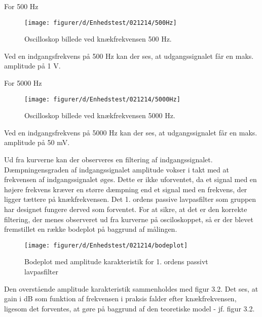 For 500 Hz

\begin{figure}[H]
    \centering
    \texttt{[image: figurer/d/Enhedstest/021214/500Hz]}
    \caption{Oscilloskop billede ved knækfrekvensen 500 Hz.}
    \label{figtest_50Hz}
\end{figure}

Ved en indgangsfrekvens på 500 Hz kan der ses, at udgangssignalet får en maks. amplitude på 1 V.

For 5000 Hz

\begin{figure}[H]
    \centering
    \texttt{[image: figurer/d/Enhedstest/021214/5000Hz]}
    \caption{Oscilloskop billede ved knækfrekvensen 5000 Hz.}
    \label{figtest_50Hz}
\end{figure}

Ved en indgangsfrekvens på 5000 Hz kan der ses, at udgangssignalet får en maks. amplitude på 50 mV.

Ud fra kurverne kan der observeres en filtering af indgangssignalet. 
Dæmpningensgraden af indgangssignalet amplitude vokser i takt med at frekvensen af indgangssignalet øges. 
Dette er ikke uforventet, da et signal med en højere frekvens kræver en større dæmpning end et signal med en frekvens, der ligger tættere på knækfrekvensen. 
Det 1. ordens passive lavpasfilter som gruppen har designet fungere derved som forventet. 
For at sikre, at det er den korrekte filtering, der menes observeret ud fra kurverne på osciloskoppet, så er der blevet fremstillet en række bodeplot på baggrund af målingen.

\begin{figure}[H]
    \centering
    \texttt{[image: figurer/d/Enhedstest/021214/bodeplot]}
    \caption{Bodeplot med amplitude karakteristik for 1. ordens passivt lavpasfilter}
    \label{figtest_bodeplot}
\end{figure}

Den overstående amplitude karakteristik sammenholdes med figur 3.2.
Det ses, at gain i dB som funktion af frekvensen i praksis falder efter knækfrekvensen, ligesom det forventes, at gøre på baggrund af den teoretiske model - jf. figur 3.2.


